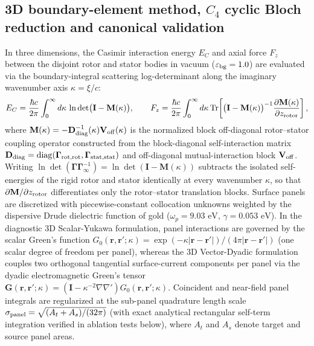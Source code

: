 \documentclass[pdflatex,sn-nature]{sn-jnl}
\begin{document}
\subsection*{3D boundary-element method, $C_4$ cyclic Bloch reduction and canonical validation}
In three dimensions, the Casimir interaction energy $E_C$ and axial force $F_z$ between the disjoint rotor and stator bodies in vacuum ($\varepsilon_{\rm bg}=1.0$) are evaluated via the boundary-integral scattering log-determinant along the imaginary wavenumber axis $\kappa = \xi/c$\cite{reid2013pra}:
\begin{equation}
E_C = \frac{\hbar c}{2\pi} \int_0^\infty d\kappa \, \ln\det\bigl(\mathbf{I} - \mathbf{M}(\kappa)\bigr),
\qquad
F_z = \frac{\hbar c}{2\pi} \int_0^\infty d\kappa \, \mathrm{Tr}\!\left[\bigl(\mathbf{I} - \mathbf{M}(\kappa)\bigr)^{-1} \frac{\partial \mathbf{M}(\kappa)}{\partial z_{\rm rotor}}\right],
\label{eq:methods_bem}
\end{equation}
where $\mathbf{M}(\kappa) = -\mathbf{D}_{\rm diag}^{-1}(\kappa)\mathbf{V}_{\rm off}(\kappa)$ is the normalized block off-diagonal rotor--stator coupling operator constructed from the block-diagonal self-interaction matrix $\mathbf{D}_{\rm diag} = \mathrm{diag}(\mathbf{\Gamma}_{\rm rot,rot}, \mathbf{\Gamma}_{\rm stat,stat})$ and off-diagonal mutual-interaction block $\mathbf{V}_{\rm off}$. Writing $\ln\det(\mathbf{\Gamma}\mathbf{\Gamma}_\infty^{-1}) = \ln\det(\mathbf{I} - \mathbf{M}(\kappa))$ subtracts the isolated self-energies of the rigid rotor and stator identically at every wavenumber $\kappa$, so that $\partial\mathbf{M}/\partial z_{\rm rotor}$ differentiates only the rotor--stator translation blocks. Surface panels are discretized with piecewise-constant collocation unknowns weighted by the dispersive Drude dielectric function of gold ($\omega_p = 9.03\text{ eV}$, $\gamma = 0.053\text{ eV}$)\cite{rakic1998}. In the diagnostic 3D Scalar-Yukawa formulation, panel interactions are governed by the scalar Green's function $G_0(\mathbf{r},\mathbf{r}';\kappa) = \exp(-\kappa |\mathbf{r}-\mathbf{r}'|)/(4\pi |\mathbf{r}-\mathbf{r}'|)$ (one scalar degree of freedom per panel), whereas the 3D Vector-Dyadic formulation couples two orthogonal tangential surface-current components per panel via the dyadic electromagnetic Green's tensor $\mathbf{G}(\mathbf{r},\mathbf{r}';\kappa) = (\mathbf{I} - \kappa^{-2}\nabla\nabla')G_0(\mathbf{r},\mathbf{r}';\kappa)$. Coincident and near-field panel integrals are regularized at the sub-panel quadrature length scale $\sigma_{\rm panel} = \sqrt{(A_t+A_s)/(32\pi)}$ (with exact analytical rectangular self-term integration verified in ablation tests below), where $A_t$ and $A_s$ denote target and source panel areas.
\end{document}
